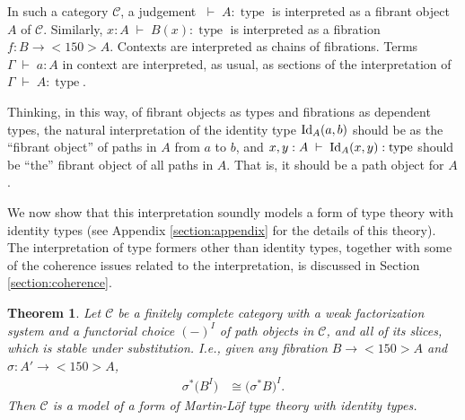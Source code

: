 \documentclass[12pt]{amsart}
\newcommand{\judge}[2]{#1\;\vdash\;#2}
\newcommand{\id}[1]{\textnormal{Id}_{#1}}
\newcommand{\type}{\operatorname{type}}
\newcommand{\iso}{\cong}
\newtheorem{theorem}{Theorem}[section]
\theoremstyle{definition}
\theoremstyle{remark}
\begin{document}
In such a category $\mathcal{C}$, a judgement $\judge{}{A:\type}$ is
interpreted as a fibrant object $A$ of $\mathcal{C}$.
Similarly, $\judge{x:A}{B(x):\type}$ is interpreted as a
fibration $f:B\to<150>A$.  Contexts are interpreted as chains of
fibrations.  Terms $\judge{\Gamma}{a:A}$ in context are interpreted,
as usual, as sections of the interpretation of
$\judge{\Gamma}{A:\type}$.  

Thinking, in this way, of fibrant objects as types and fibrations as
dependent types, the natural interpretation of the identity type
$\id{A}(a,b)$ should be as the ``fibrant object'' of paths in $A$ from $a$ to
$b$, and $\judge{x,y:A}{\id{A}(x,y):\type}$ should be ``the'' fibrant
object of all paths in $A$.  That is, it should be a path object for $A$.

We now show that this interpretation soundly models a form of
type theory with identity types (see Appendix \ref{section:appendix}
for the details of this theory).  The interpretation of type formers
other than identity types, together with some of the coherence issues
related to the interpretation, is discussed in Section \ref{section:coherence}.
\begin{theorem}\label{theorem:main}
  Let $\mathcal{C}$ be a finitely complete category with a weak
  factorization system and a functorial choice $(-)^{I}$ of path
  objects in $\mathcal{C}$, and
  all of its slices, which is stable under substitution.  I.e., given
  any fibration $B\to<150>A$ and $\sigma:A'\to<150>A$,
  \begin{align*}
    \sigma^{*}\bigl(B^{I}\bigr) & \iso \bigl(\sigma^{*}B\bigr)^{I}.
  \end{align*}
  Then $\mathcal{C}$ is a model of a form of Martin-L\"{o}f type theory
  with identity types.  
\end{theorem}
\end{document}
